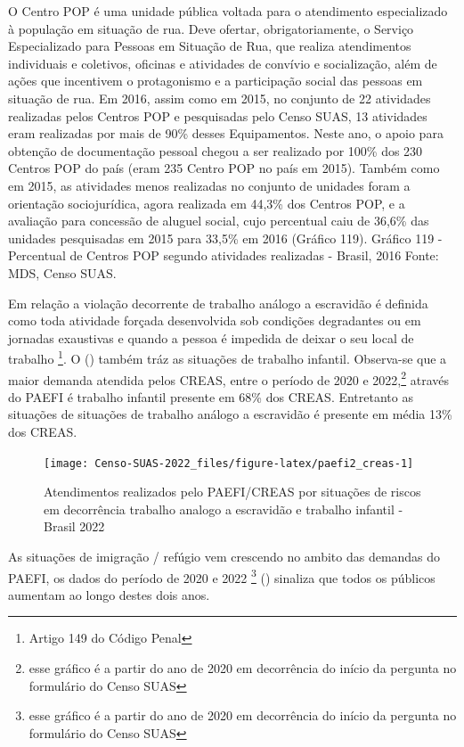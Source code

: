 \documentclass[
  brazilian]{report}
\begin{document}
O Centro POP é uma unidade pública voltada para o atendimento
especializado à população em situação de rua. Deve ofertar,
obrigatoriamente, o Serviço Especializado para Pessoas em Situação de
Rua, que realiza atendimentos individuais e coletivos, oficinas e
atividades de convívio e socialização, além de ações que incentivem o
protagonismo e a participação social das pessoas em situação de rua. Em
2016, assim como em 2015, no conjunto de 22 atividades realizadas pelos
Centros POP e pesquisadas pelo Censo SUAS, 13 atividades eram realizadas
por mais de 90\% desses Equipamentos. Neste ano, o apoio para obtenção
de documentação pessoal chegou a ser realizado por 100\% dos 230 Centros
POP do país (eram 235 Centro POP no país em 2015). Também como em 2015,
as atividades menos realizadas no conjunto de unidades foram a
orientação sociojurídica, agora realizada em 44,3\% dos Centros POP, e a
avaliação para concessão de aluguel social, cujo percentual caiu de
36,6\% das unidades pesquisadas em 2015 para 33,5\% em 2016 (Gráfico
119). Gráfico 119 - Percentual de Centros POP segundo atividades
realizadas - Brasil, 2016 Fonte: MDS, Censo SUAS.

Em relação a violação decorrente de trabalho análogo a escravidão é
definida como toda atividade forçada desenvolvida sob condições
degradantes ou em jornadas exaustivas e quando a pessoa é impedida de
deixar o seu local de trabalho \footnote{Artigo 149 do Código Penal}. O
() também tráz as situações de trabalho infantil.
Observa-se que a maior demanda atendida pelos CREAS, entre o período de
2020 e
2022,\footnote{esse gráfico é a partir do ano de 2020 em decorrência do início da pergunta no formulário do Censo SUAS}
através do PAEFI é trabalho infantil presente em 68\% dos CREAS.
Entretanto as situações de situações de trabalho análogo a escravidão é
presente em média 13\% dos CREAS.

\begin{figure}
\texttt{[image: Censo-SUAS-2022\_files/figure-latex/paefi2\_creas-1]} \caption[Atendimentos realizados pelo PAEFI/CREAS por situações de riscos em decorrência trabalho analogo a escravidão e trabalho infantil - Brasil  2022]{Atendimentos realizados pelo PAEFI/CREAS por situações de riscos em decorrência trabalho analogo a escravidão e trabalho infantil - Brasil  2022}\label{fig:paefi2_creas}
\end{figure}

As situações de imigração / refúgio vem crescendo no ambito das demandas
do PAEFI, os dados do período de 2020 e 2022
\footnote{esse gráfico é a partir do ano de 2020 em decorrência do início da pergunta no formulário do Censo SUAS}
() sinaliza que todos os públicos aumentam ao
longo destes dois anos.
\end{document}
